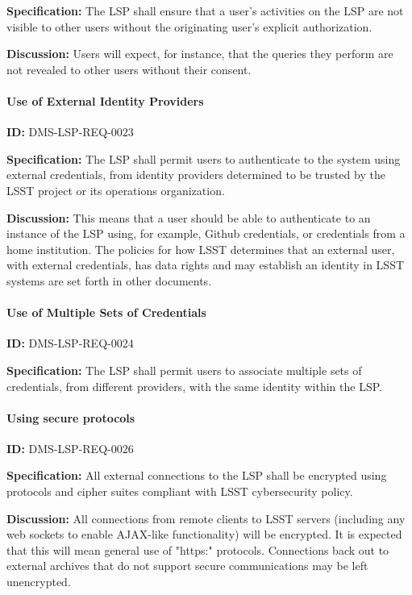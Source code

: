 \documentclass[SE,toc,lsstdraft]{lsstdoc}
\begin{document}
\textbf{Specification:}
The LSP shall ensure that a user's activities on the LSP are not visible to other users without the originating user's explicit authorization.

\textbf{Discussion:}
Users will expect, for instance, that the queries they perform are not revealed to other users without their consent.

\paragraph{Use of External Identity Providers}\hfill  %

\label{DMS-LSP-REQ-0023}
\textbf{ID:} DMS-LSP-REQ-0023

\textbf{Specification:}
The LSP shall permit users to authenticate to the system using external credentials, from identity providers determined to be trusted by the LSST project or its operations organization.

\textbf{Discussion:}
This means that a user should be able to authenticate to an instance of the LSP using, for example, Github credentials, or credentials from a home institution.
The policies for how LSST determines that an external user, with external credentials, has data rights and may establish an identity in LSST systems are set forth in other documents.

\paragraph{Use of Multiple Sets of Credentials}\hfill  %

\label{DMS-LSP-REQ-0024}
\textbf{ID:} DMS-LSP-REQ-0024

\textbf{Specification:}
The LSP shall permit users to associate multiple sets of credentials, from different providers, with the same identity within the LSP.

\paragraph{Using secure protocols}\hfill  %

\label{DMS-LSP-REQ-0026}
\textbf{ID:} DMS-LSP-REQ-0026

\textbf{Specification:}
All external connections to the LSP shall be encrypted using protocols and cipher suites compliant with LSST cybersecurity policy.

\textbf{Discussion:}
All connections from remote clients to LSST servers (including any web sockets to enable AJAX-like functionality) will be encrypted. It is expected that this will mean general use of "https:" protocols.
Connections back out to external archives that do not support secure communications may be left unencrypted.
\end{document}
